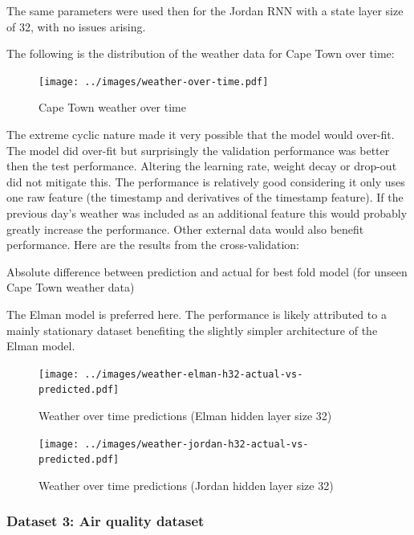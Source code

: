 \documentclass[conference]{IEEEtran}
\begin{document}
The same parameters were used then for the Jordan RNN with a state layer size of 32, with no issues arising.

The following is the distribution of the weather data for Cape Town over time:

\begin{figure}[H] 
	\centering
	\texttt{[image: ../images/weather-over-time.pdf]}
	\caption{Cape Town weather over time}
	\label{fig:cape-town-weather-time}
\end{figure}

The extreme cyclic nature made it very possible that the model would over-fit. The model did over-fit but surprisingly the validation performance was better then the test performance. Altering the learning rate, weight decay or drop-out did not mitigate this. The performance is relatively good considering it only uses one raw feature (the timestamp and derivatives of the timestamp feature). If the previous day's weather was included as an additional feature this would probably greatly increase the performance. Other external data would also benefit performance. Here are the results from the cross-validation:

\begin{table}[H]
	\caption{Absolute difference between prediction and actual for best fold model (for unseen Cape Town weather data)}
	\label{tab:weather-ct-summary}
\end{table}

The Elman model is preferred here. The performance is likely attributed to a mainly stationary dataset benefiting the slightly simpler architecture of the Elman model.

\begin{figure}[H] 
	\centering
	\texttt{[image: ../images/weather-elman-h32-actual-vs-predicted.pdf]}
	\caption{Weather over time predictions (Elman hidden layer size 32)}
	\label{fig:weather-predictions-elman}
\end{figure}

\begin{figure}[H] 
	\centering
	\texttt{[image: ../images/weather-jordan-h32-actual-vs-predicted.pdf]}
	\caption{Weather over time predictions (Jordan hidden layer size 32)}
	\label{fig:weather-predictions-jordan}
\end{figure}

\subsubsection{Dataset 3: Air quality dataset}
\end{document}
